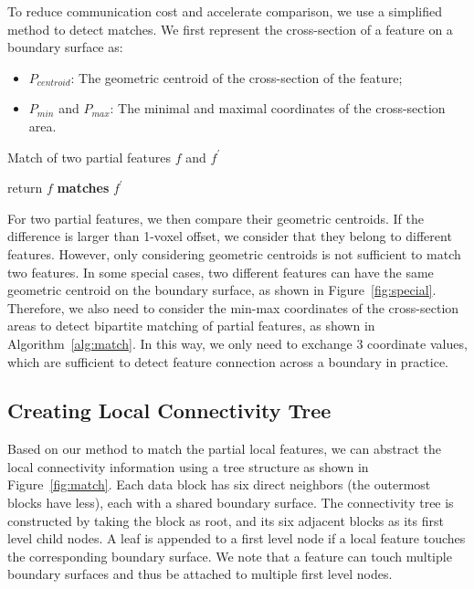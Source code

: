 To reduce communication cost and accelerate comparison, we use a simplified method to detect matches. We first represent the cross-section of a feature on a boundary surface as:

\begin{itemize}

\item $P_{centroid}$: The geometric centroid of the cross-section of the feature;

\item $P_{min}$ and $P_{max}$: The minimal and maximal coordinates of the cross-section area.

\end{itemize}

\begin{algorithm}[t]
\caption{Match of two partial features $f$ and $f^{'}$}
	\begin{algorithmic}
			\STATE return $f$ \textbf{matches} $f^{'}$
		\ENDIF
	\end{algorithmic}
\label{alg:match}
\end{algorithm}

For two partial features, we then compare their geometric centroids. If the difference is larger than 1-voxel offset, we consider that they belong to different features. However, only considering geometric centroids is not sufficient to match two features. In some special cases, two different features can have the same geometric centroid on the boundary surface, as shown in Figure~\ref{fig:special}. Therefore, we also need to consider the min-max coordinates of the cross-section areas to detect bipartite matching of partial features, as shown in Algorithm~\ref{alg:match}. In this way, we only need to exchange 3 coordinate values, which are sufficient to detect feature connection across a boundary in practice.

\subsection{Creating Local Connectivity Tree}

Based on our method to match the partial local features, we can abstract the local connectivity information using a tree structure as shown in Figure~\ref{fig:match}. Each data block has six direct neighbors (the outermost blocks have less), each with a shared boundary surface. The connectivity tree is constructed by taking the block as root, and its six adjacent blocks as its first level child nodes. A leaf is appended to a first level node if a local feature touches the corresponding boundary surface. We note that a feature can touch multiple boundary surfaces and thus be attached to multiple first level nodes.

